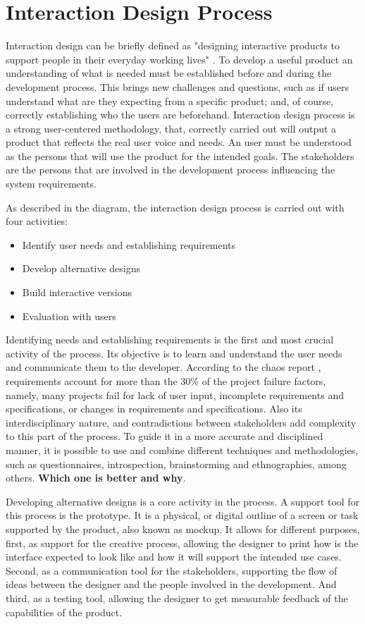 \section{Interaction Design Process}
Interaction design can be briefly defined as "designing interactive products to support people in their everyday working lives" \cite{Sharp2011}. To develop a useful product an understanding of what is needed must be established before and during the development process. This brings new challenges and questions, such as if users understand what are they expecting from a specific product; and, of course, correctly establishing who the users are beforehand. Interaction design process is a strong user-centered methodology, that, correctly carried out will output a product that reflects the real user voice and needs. An user must be understood as the persons that will use the product for the intended goals. The stakeholders are the persons that are involved in the development process influencing the system requirements.

As described in the diagram, the interaction design process is carried out with four activities: \begin{itemize}
  \item Identify user needs and establishing requirements
  \item Develop alternative designs
  \item Build interactive versions
  \item Evaluation with users
\end{itemize}
  Identifying needs and establishing requirements is the first and most crucial activity of the process. Its objective is to learn and understand the user needs and communicate them to the developer. According to the chaos report \cite{Group1994}, requirements account for more than the 30\% of the project failure factors, namely, many projects fail for lack  of user input, incomplete requirements and specifications, or changes in requirements and specifications. Also its interdisciplinary nature, and contradictions between stakeholders add complexity to this part of the process. To guide it in a more accurate and disciplined manner, it is possible to use and combine different techniques and methodologies, such as questionnaires, introspection, brainstorming and ethnographies, among others. \textbf{Which one is better and why}\cite{Coulin2005RequirementsTechniques}.

Developing alternative designs is a core activity in the process. A support tool for this process is the prototype. It is a physical, or digital outline of a screen or task supported by the product, also known as mockup. It allows for different purposes, first, as support for the creative process, allowing the designer to print how is the interface expected to look like and how it will support the intended use cases. Second, as a communication tool for the stakeholders, supporting the flow of ideas between the designer and the people involved in the development. And third, as a testing tool, allowing the designer to get measurable feedback of the capabilities of the product.